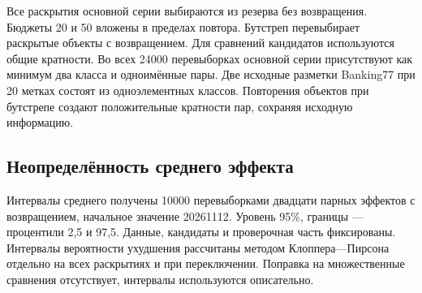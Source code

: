 Все раскрытия основной серии выбираются из резерва без возвращения. Бюджеты 20 и 50 вложены в пределах повтора. Бутстреп перевыбирает раскрытые объекты с возвращением. Для сравнений кандидатов используются общие кратности. Во всех 24000 перевыборках основной серии присутствуют как минимум два класса и одноимённые пары. Две исходные разметки Banking77 при 20 метках состоят из одноэлементных классов. Повторения объектов при бутстрепе создают положительные кратности пар, сохраняя исходную информацию.

\subsection{Неопределённость среднего эффекта}
Интервалы среднего получены 10000 перевыборками двадцати парных эффектов с возвращением, начальное значение 20261112. Уровень 95\%, границы --- процентили 2,5 и 97,5. Данные, кандидаты и проверочная часть фиксированы. Интервалы вероятности ухудшения рассчитаны методом Клоппера---Пирсона отдельно на всех раскрытиях и при переключении. Поправка на множественные сравнения отсутствует, интервалы используются описательно.

